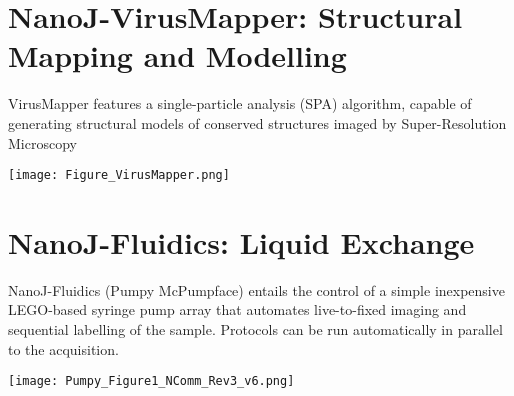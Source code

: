 \documentclass[a0,portrait]{a0poster}
\begin{document}
\begin{multicols}{3}
\section*{NanoJ-VirusMapper: Structural Mapping and Modelling}

VirusMapper features a single-particle analysis (SPA) algorithm, capable of generating structural models of conserved structures imaged by Super-Resolution Microscopy

\begin{center}\vspace{1cm}
\texttt{[image: Figure\_VirusMapper.png]}
\end{center}%

\section*{NanoJ-Fluidics: Liquid Exchange}

NanoJ-Fluidics (Pumpy McPumpface) entails the control of a simple inexpensive LEGO-based syringe pump array that automates live-to-fixed imaging and sequential labelling of the sample. Protocols can be run automatically in parallel to the acquisition.

\begin{center}\vspace{1cm}
\texttt{[image: Pumpy\_Figure1\_NComm\_Rev3\_v6.png]}
\end{center}%




\end{multicols}
\end{document}
